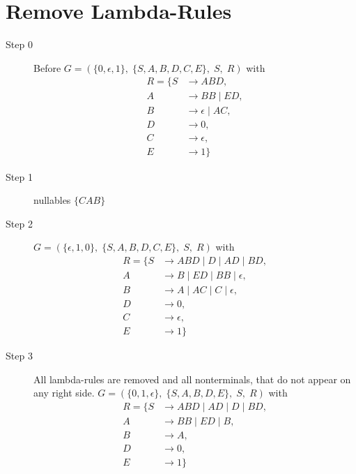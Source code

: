 \documentclass{article}
\begin{document}
\section{Remove Lambda-Rules}
\begin{description}
	\item[Step 0] Before
	$G=\left(\{	0, \epsilon, 1\},\;\{ S, A, B, D, C, E\},\;S,\;R\right)$ with
	\begin{align*}
		R=\{	S &\rightarrow ABD, \\ 
		A &\rightarrow BB\;|\;ED, \\ 
		B &\rightarrow \epsilon\;|\;AC, \\ 
		D &\rightarrow 0, \\ 
		C &\rightarrow \epsilon, \\ 
		E &\rightarrow 1\}
	\end{align*}
	\item[Step 1] nullables
$\{C A B \}$
	\item[Step 2] 
	$G=\left(\{	\epsilon, 1, 0\},\;\{ S, A, B, D, C, E\},\;S,\;R\right)$ with
	\begin{align*}
		R=\{	S &\rightarrow ABD\;|\;D\;|\;AD\;|\;BD, \\ 
		A &\rightarrow B\;|\;ED\;|\;BB\;|\;\epsilon, \\ 
		B &\rightarrow A\;|\;AC\;|\;C\;|\;\epsilon, \\ 
		D &\rightarrow 0, \\ 
		C &\rightarrow \epsilon, \\ 
		E &\rightarrow 1\}
	\end{align*}
	\item[Step 3] All lambda-rules are removed and all nonterminals, that do not appear on any right side.
	$G=\left(\{	0, 1, \epsilon\},\;\{ S, A, B, D, E\},\;S,\;R\right)$ with
	\begin{align*}
		R=\{	S &\rightarrow ABD\;|\;AD\;|\;D\;|\;BD, \\ 
		A &\rightarrow BB\;|\;ED\;|\;B, \\ 
		B &\rightarrow A, \\ 
		D &\rightarrow 0, \\ 
		E &\rightarrow 1\}
	\end{align*}
\end{description}
\end{document}
